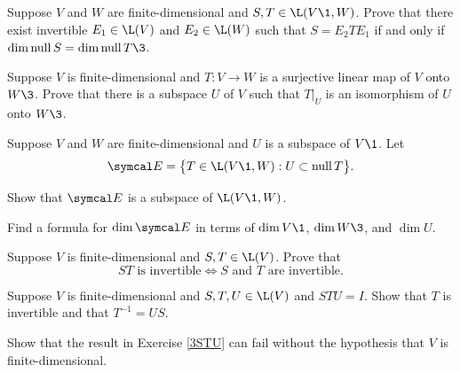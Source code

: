 \begin{exercises}
\exercise
Suppose $V$ and $W$ are finite-dimensional and $S, T\in \L(V\1, W)$. Prove that there exist invertible
$E_1 \in \L(V)$ and $E_2\in \L(W)$ such that $S = E_2 T E_1$ if and only if $\dim \ker S = \dim \ker T\3$.

\exercise
Suppose $V$ is finite-dimensional and $T \colon V \to W$ is a surjective linear map of $V$ onto $W\3$.  Prove that there is a subspace $U$ of $V$ such that $T|_U$ is an isomorphism of $U$ onto $W\3$.


\exercise
Suppose $V$ and $W$ are finite-dimensional and $U$ is a subspace of $V\1$. Let
\[ \addtolength{\belowdisplayskip}{-3bp}
\E = \br[\big]{ T \in \L(V\1, W): U \subset \ker T}.
\]
\begin{subtheorem}
\item
Show that $\E$ is a subspace of $\L(V\1, W)$.
\item
Find a formula for $\dim \E$ in terms of $\dim V\1$, $\dim W\3$, and $\dim U$.
\end{subtheorem}


\exercise
Suppose $V$ is finite-dimensional and $S, T \in \L(V)$.  Prove that \label{379}
\[
ST \text{ is invertible} \iff S \text{ and } T \text{ are invertible}.
\]
\exercisedisplayend


\exercise
Suppose $V$ is finite-dimensional and $S, T, U \in \L(V)$ and
$
STU = I$.
Show that $T$ is invertible and that $T^{-1} = US$.\label{3STU}


\exercise
Show that the result in Exercise \ref{3STU} can fail without the hypothesis that $V$ is finite-dimensional.



\end{exercises}
